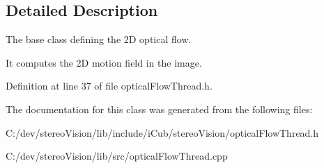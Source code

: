 \subsection{Detailed Description}
The base class defining the 2\+D optical flow. 

It computes the 2\+D motion field in the image. 

Definition at line 37 of file optical\+Flow\+Thread.\+h.



The documentation for this class was generated from the following files\+:\begin{DoxyCompactItemize}
\item 
C\+:/dev/stereo\+Vision/lib/include/i\+Cub/stereo\+Vision/optical\+Flow\+Thread.\+h\item 
C\+:/dev/stereo\+Vision/lib/src/optical\+Flow\+Thread.\+cpp\end{DoxyCompactItemize}
